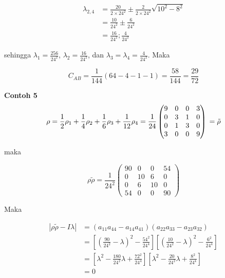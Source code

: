 \begin{equation}
	\begin{aligned}
		\lambda_{2,4}
		&=\frac{20}{2\times24^2}\pm\frac{2}{2\times24^2}\sqrt{10^2-8^2}\\
		&=\frac{10}{24^2}\pm\frac{6}{24^2}\\
		&=\frac{16}{24^2}; \frac{4}{24^2}
	\end{aligned}
\end{equation}

sehingga $\lambda_1=\frac{256}{24^2}$, $\lambda_2=\frac{16}{24^2}$, dan $
\lambda_3=\lambda_4=\frac{4}{24^2}$. Maka

\begin{equation}
	C_{AB}=\frac{1}{144}(64-4-1-1)=\frac{58}{144}=\frac{29}{72}
\end{equation}

\textbf{Contoh 5}
\begin{equation}
	\rho = \frac{1}{2}\rho_1 + \frac{1}{4}\rho_2
	+\frac{1}{6}\rho_3+\frac{1}{12}\rho_4\\
	=\frac{1}{24}
	\begin{pmatrix}
		9&0&0&3\\
		0&3&1&0\\
		0&1&3&0\\
		3&0&0&9
	\end{pmatrix}\\
	=\tilde{\rho}
\end{equation}

maka 

\begin{equation}
	\rho \tilde{\rho} =\frac{1}{24^2}
	\begin{pmatrix}
		90&0&0&54\\
		0&10&6&0\\
		0&6&10&0\\
		54&0&0&90
	\end{pmatrix}
\end{equation}

Maka

\begin{equation}
	\begin{aligned}
		|\rho \tilde{\rho}-I\lambda|
		&=(a_{11}a_{44}-a_{14}a_{41})(a_{22}a_{33}-a_{23}a_{32})\\
		&=[(\frac{90}{24^2}-\lambda)^2-\frac{54^2}{24^4}][(\frac{10}{24^2}-\lambda)^2-\frac{6^2}{24^4}]\\
		&=[\lambda^2-\frac{180}{24^2}\lambda+\frac{72^2}{24^4}][\lambda^2-\frac{20}{24^2}\lambda+\frac{8^2}{24^4}]\\
		&=0
	\end{aligned}
\end{equation}

